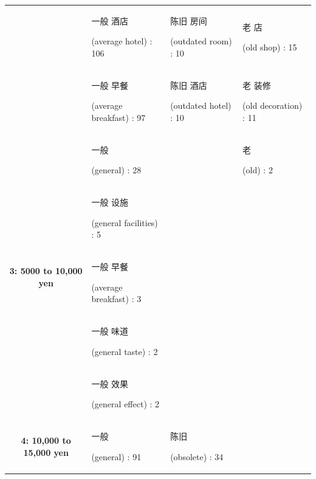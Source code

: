 \documentclass[smallextended,natbib]{svjour3}       %
\begin{document}
\begin{landscape}
\begin{table}[p]
{\begin{tabular}{|c|l|l|l|}
         &
          \begin{CJK}{UTF8}{gbsn}一般 酒店\end{CJK} (average hotel) : 106 &
          \begin{CJK}{UTF8}{gbsn}陈旧 房间\end{CJK} (outdated room) : 10 &
          \begin{CJK}{UTF8}{gbsn}老 店\end{CJK} (old shop) : 15 \\
         &
          \begin{CJK}{UTF8}{gbsn}一般 早餐\end{CJK} (average breakfast) : 97 &
          \begin{CJK}{UTF8}{gbsn}陈旧 酒店\end{CJK} (outdated hotel) : 10 &
          \begin{CJK}{UTF8}{gbsn}老 装修\end{CJK} (old decoration) : 11 \\ \hline
        \multirow{5}{*}{\textbf{3: 5000 to 10,000 yen}} &
          \begin{CJK}{UTF8}{gbsn}一般\end{CJK} (general) : 28 &
           &
          \begin{CJK}{UTF8}{gbsn}老\end{CJK} (old) : 2 \\
         &
          \begin{CJK}{UTF8}{gbsn}一般 设施\end{CJK} (general facilities) : 5 &
           &
           \\
         &
          \begin{CJK}{UTF8}{gbsn}一般 早餐\end{CJK} (average breakfast) : 3 &
           &
           \\
         &
          \begin{CJK}{UTF8}{gbsn}一般 味道\end{CJK} (general taste) : 2 &
           &
           \\
         &
          \begin{CJK}{UTF8}{gbsn}一般 效果\end{CJK} (general effect) : 2 &
           &
           \\ \hline
        \multirow{5}{*}{\textbf{4: 10,000 to 15,000 yen}} &
          \begin{CJK}{UTF8}{gbsn}一般\end{CJK} (general) : 91 &
          \begin{CJK}{UTF8}{gbsn}陈旧\end{CJK} (obsolete) : 34 &

\end{tabular}}
\end{table}
\end{landscape}
\end{document}
